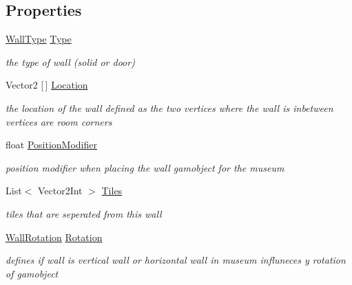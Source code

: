 \subsection*{Properties}
\begin{DoxyCompactItemize}
\item 
\mbox{\hyperlink{class_wall_a1366d94ac70428624a6703d7db89638d}{Wall\+Type}} \mbox{\hyperlink{class_wall_ade4c1924f35fd33637a3cdfa31566af0}{Type}}
\begin{DoxyCompactList}\small\item\em the type of wall (solid or door) \end{DoxyCompactList}\item 
Vector2 \mbox{[}$\,$\mbox{]} \mbox{\hyperlink{class_wall_ac7769d0a497da7e7ae3a11c813645b7a}{Location}}
\begin{DoxyCompactList}\small\item\em the location of the wall defined as the two vertices where the wall is inbetween vertices are room corners \end{DoxyCompactList}\item 
float \mbox{\hyperlink{class_wall_ae056b7b9068536491c1ac441a25824a0}{Position\+Modifier}}
\begin{DoxyCompactList}\small\item\em position modifier when placing the wall gamobject for the museum \end{DoxyCompactList}\item 
List$<$ Vector2\+Int $>$ \mbox{\hyperlink{class_wall_a1e5fab93aa7e8676dd65a61a26b28513}{Tiles}}
\begin{DoxyCompactList}\small\item\em tiles that are seperated from this wall \end{DoxyCompactList}\item 
\mbox{\hyperlink{class_wall_a0ff16a0e73bfc8f0d89c5fd6849e3a97}{Wall\+Rotation}} \mbox{\hyperlink{class_wall_aa2d6c86c7ccabbb5e317b9ccac62e99e}{Rotation}}
\begin{DoxyCompactList}\small\item\em defines if wall is vertical wall or horizontal wall in museum influneces y rotation of gamobject \end{DoxyCompactList}\item 

\end{DoxyCompactItemize}
